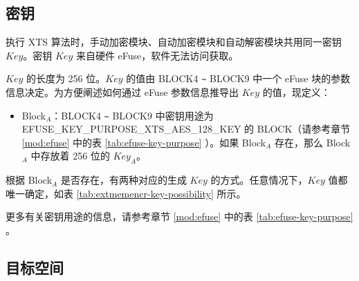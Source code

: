 \documentclass[main\_\_CN.tex]{subfiles}
\begin{document}
\subsection{密钥}
\label{sec:extmemncr-key}

执行 XTS 算法时，手动加密模块、自动加密模块和自动解密模块共用同一密钥 \begin{math}\mathit{Key}\end{math}。密钥 \begin{math}\mathit{Key}\end{math} 来自硬件 eFuse，软件无法访问获取。

\begin{math}\mathit{Key}\end{math} 的长度为 256 位。\begin{math}\mathit{Key}\end{math} 的值由 BLOCK4 \verb+~+ BLOCK9 中一个 eFuse 块的参数信息决定。为方便阐述如何通过 eFuse 参数信息推导出 \begin{math}\mathit{Key}\end{math} 的值，现定义：
\begin{itemize}
    \item Block$_A$：BLOCK4 \verb+~+ BLOCK9 中密钥用途为 EFUSE\_KEY\_PURPOSE\_XTS\_AES\_128\_KEY 的 BLOCK（请参考章节 \ref{mod:efuse} \textit{} 中的表 \ref{tab:efuse-key-purpose} \textit{}）。如果 Block$_A$ 存在，那么 Block$_A$ 中存放着 256 位的 \begin{math}\mathit{Key}_{A}\end{math}。
\end{itemize}

根据 Block$_A$ 是否存在，有两种对应的生成 \begin{math}\mathit{Key}\end{math} 的方式。任意情况下，\begin{math}\mathit{Key}\end{math} 值都唯一确定，如表 \ref{tab:extmemencr-key-possibility} 所示。



更多有关密钥用途的信息，请参考章节 \ref{mod:efuse} \textit{} 中的表 \ref{tab:efuse-key-purpose} \textit{}。

\subsection{目标空间}
\label{sec:extmemencr-target-space}
\end{document}
